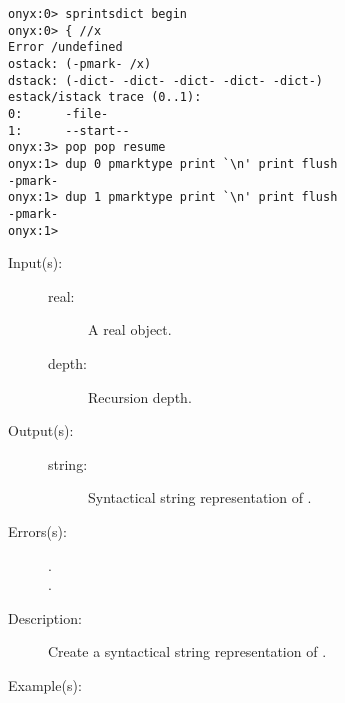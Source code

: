 \begin{description}
\begin{description}
\begin{verbatim}
onyx:0> sprintsdict begin
onyx:0> { //x
Error /undefined
ostack: (-pmark- /x)
dstack: (-dict- -dict- -dict- -dict- -dict-)
estack/istack trace (0..1):
0:      -file-
1:      --start--
onyx:3> pop pop resume
onyx:1> dup 0 pmarktype print `\n' print flush
-pmark-
onyx:1> dup 1 pmarktype print `\n' print flush
-pmark-
onyx:1>
		\end{verbatim}
	\end{description}
\label{sprintsdict:realtype}
\item[{\onyxop{real depth}{realtype}{string}}: ]
	\begin{description}\item[]
	\item[Input(s): ]
		\begin{description}\item[]
		\item[real: ]
			A real object.
		\item[depth: ]
			Recursion depth.
		\end{description}
	\item[Output(s): ]
		\begin{description}\item[]
		\item[string: ]
			Syntactical string representation of .
		\end{description}
	\item[Errors(s): ]
		\begin{description}\item[]
		\item[.]
		\item[.]
		\end{description}
	\item[Description: ]
		Create a syntactical string representation of .
	\item[Example(s): ]\begin{verbatim}


\end{verbatim}
\end{description}
\end{description}
